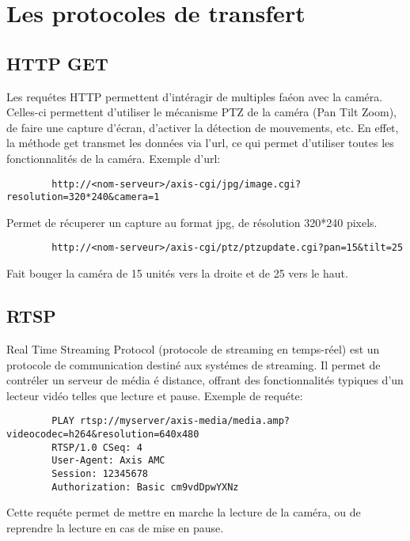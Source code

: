 	\section{Les protocoles de transfert}
		\subsection{HTTP GET}
		Les requétes HTTP permettent d'intéragir de multiples faéon avec la caméra.
		Celles-ci permettent d'utiliser le mécanisme PTZ de la caméra (Pan Tilt
		Zoom), de faire une capture d'écran, d'activer la détection de mouvements,
		etc. 
		En effet, la méthode get transmet les données via l'url, ce qui permet
		d'utiliser toutes les fonctionnalités de la caméra. 
		Exemple d'url:
		\begin{lstlisting}
		http://<nom-serveur>/axis-cgi/jpg/image.cgi?resolution=320*240&camera=1
		\end{lstlisting}
		Permet de récuperer un capture au format jpg, de résolution 320*240 pixels.
		\begin{lstlisting}
		http://<nom-serveur>/axis-cgi/ptz/ptzupdate.cgi?pan=15&tilt=25
		\end{lstlisting}
		Fait bouger la caméra de 15 unités vers la droite et de 25 vers le haut.

		\subsection{RTSP}
		Real Time Streaming Protocol (protocole de streaming en temps-réel) est un
		protocole de communication destiné aux systémes de streaming. Il permet
		de contréler un serveur de média é distance, offrant des fonctionnalités
		typiques d'un lecteur vidéo telles que lecture et pause.
		Exemple de requéte:
		\begin{lstlisting}
		PLAY rtsp://myserver/axis-media/media.amp?videocodec=h264&resolution=640x480
		RTSP/1.0 CSeq: 4
		User-Agent: Axis AMC
		Session: 12345678
		Authorization: Basic cm9vdDpwYXNz
		\end{lstlisting}
		Cette requéte permet de mettre en marche la lecture de la caméra, ou de
		reprendre la lecture en cas de mise en pause.
